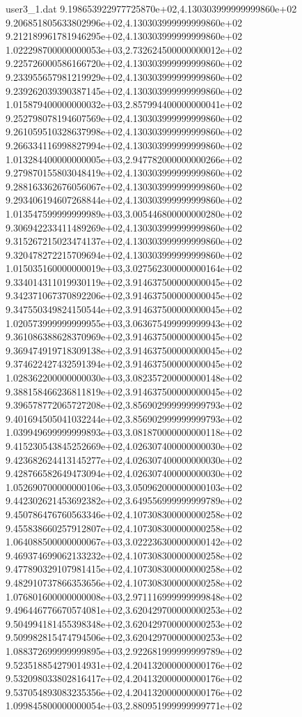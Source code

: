 \begin{filecontents}{user3_1.dat}
9.198653922977725870e+02,4.130303999999999860e+02
9.206851805633802996e+02,4.130303999999999860e+02
9.212189961781946295e+02,4.130303999999999860e+02
1.022298700000000053e+03,2.732624500000000012e+02
9.225726000586166720e+02,4.130303999999999860e+02
9.233955657981219929e+02,4.130303999999999860e+02
9.239262039390387145e+02,4.130303999999999860e+02
1.015879400000000032e+03,2.857994400000000041e+02
9.252798078194607569e+02,4.130303999999999860e+02
9.261059510328637998e+02,4.130303999999999860e+02
9.266334116998827994e+02,4.130303999999999860e+02
1.013284400000000005e+03,2.947782000000000266e+02
9.279870155803048419e+02,4.130303999999999860e+02
9.288163362676056067e+02,4.130303999999999860e+02
9.293406194607268844e+02,4.130303999999999860e+02
1.013547599999999989e+03,3.005446800000000280e+02
9.306942233411489269e+02,4.130303999999999860e+02
9.315267215023474137e+02,4.130303999999999860e+02
9.320478272215709694e+02,4.130303999999999860e+02
1.015035160000000019e+03,3.027562300000000164e+02
9.334014311019930119e+02,3.914637500000000045e+02
9.342371067370892206e+02,3.914637500000000045e+02
9.347550349824150544e+02,3.914637500000000045e+02
1.020573999999999955e+03,3.063675499999999943e+02
9.361086388628370969e+02,3.914637500000000045e+02
9.369474919718309138e+02,3.914637500000000045e+02
9.374622427432591394e+02,3.914637500000000045e+02
1.028362200000000030e+03,3.082357200000000148e+02
9.388158466236811819e+02,3.914637500000000045e+02
9.396578772065727208e+02,3.856902999999999793e+02
9.401694505041032244e+02,3.856902999999999793e+02
1.039949699999999893e+03,3.081870000000000118e+02
9.415230543845252669e+02,4.026307400000000030e+02
9.423682624413145277e+02,4.026307400000000030e+02
9.428766582649473094e+02,4.026307400000000030e+02
1.052690700000000106e+03,3.050962000000000103e+02
9.442302621453692382e+02,3.649556999999999789e+02
9.450786476760563346e+02,4.107308300000000258e+02
9.455838660257912807e+02,4.107308300000000258e+02
1.064088500000000067e+03,3.022236300000000142e+02
9.469374699062133232e+02,4.107308300000000258e+02
9.477890329107981415e+02,4.107308300000000258e+02
9.482910737866353656e+02,4.107308300000000258e+02
1.076801600000000008e+03,2.971116999999999848e+02
9.496446776670574081e+02,3.620429700000000253e+02
9.504994181455398348e+02,3.620429700000000253e+02
9.509982815474794506e+02,3.620429700000000253e+02
1.088372699999999895e+03,2.922681999999999789e+02
9.523518854279014931e+02,4.204132000000000176e+02
9.532098033802816417e+02,4.204132000000000176e+02
9.537054893083235356e+02,4.204132000000000176e+02
1.099845800000000054e+03,2.880951999999999771e+02

\end{filecontents}
